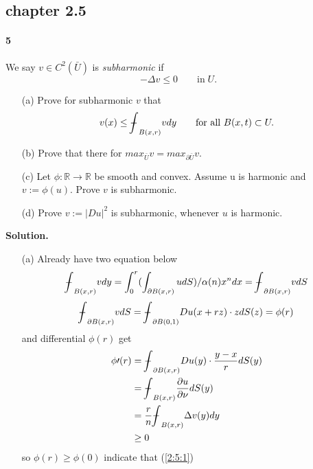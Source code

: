 \message{ !name(21935004-\unexpanded{谭焱}-homework2.tex)}\documentclass[a4paper]{book}
\newenvironment{solution}%
{\noindent\textbf{Solution.}}%
{\qedhere}
\newcommand\dbbint{{-\mkern -19mu\int}}
\numberwithin{equation}{chapter}
\theoremstyle{definition}
\begin{document}
\begin{multicols}{2}
\setlength{\columnseprule}{0.2pt}  

\section{chapter 2.5}
\paragraph{5}
We say $v \in C^2(\bar{U})$ is \textit{subharmonic} if 
\begin{equation} \label{2:5:1}
	-\Delta v \leq 0 \qquad \text{in} \; U.
\end{equation}
\begin{itemize}
	\item[(a)] Prove for subharmonic $v$ that 
	\begin{equation} \label{2:5:2} 
	v(x) \leq \dbbint_{B(x,r)} v dy \qquad \text{for all } B(x,t) \subset U.
	\end{equation}
	\item[(b)] Prove that there for $ max_{\bar{U}} v = max_{\partial\bar{U}} v. $
	\item[(c)] Let $\phi : \mathbb{R} \rightarrow \mathbb{R} $ be smooth and convex. Assume u is harmonic and $ v := \phi(u)$. Prove $v$ is subharmonic.
	\item[(d)] Prove $v := |Du|^2$ is subharmonic, whenever $u$ is harmonic.
\end{itemize}

\begin{solution}
	\begin{itemize}
		\item[(a)] Already have two equation below
		$$ \dbbint_{B(x,r)} v dy = \int_{0}^{r}(\int_{\partial B(x,r)} u dS) / \alpha (n) x^n dx = \dbbint_{\partial B(x,r)} v dS $$
		$$ \dbbint_{\partial B(x,r)} v dS = \dbbint_{\partial B(0,1)}Du(x + rz) \cdot z dS(z) = \phi (r) $$
		and differential $\phi(r)$ get 
		\begin{equation} 
		\begin{aligned} 
		 \phi \prime (r) &= \dbbint_{\partial B(x,r)} Du(y) \cdot \frac{y -x}{r} dS(y) \\
		&= \dbbint_{B(x,r)} \frac{\partial u}{\partial \nu} dS(y) \\
		&= \frac{r}{n} \dbbint_{B(x,r)} \Delta v(y) dy \\
		&\geq 0
		\end{aligned} 
		\end{equation} 
		so $\phi(r) \geq \phi(0) $ indicate that (\ref{2:5:1})
		

\end{itemize}
\end{solution}
\end{multicols}
\end{document}
